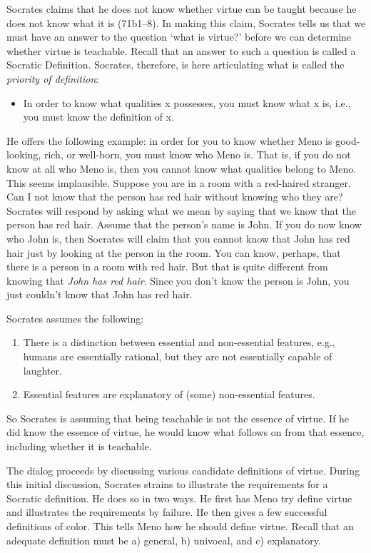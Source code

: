\documentclass[10 pt]{article}
\begin{document}
Socrates claims that he does not know whether virtue can be taught because he does not know what it is (71b1--8). In making this claim, Socrates tells us that we must have an answer to the question `what is virtue?' before we can determine whether virtue is teachable. Recall that an answer to such a question is called a Socratic Definition. Socrates, therefore, is here articulating what is called the \emph{priority of definition}:
\begin{itemize}
\item In order to know what qualities x possesses, you must know what x is, i.e., you must know the definition of x. 
\end{itemize}
He offers the following example: in order for you to know whether Meno is good-looking, rich, or well-born, you must know who Meno is. That is, if you do not know at all who Meno is, then you cannot know what qualities belong to Meno. This seems implausible. Suppose you are in a room with a red-haired stranger. Can I not know that the person has red hair without knowing who they are? Socrates will respond by asking what we mean by saying that we know that the person has red hair. Assume that the person's name is John. If you do now know who John is, then Socrates will claim that you cannot know that John has red hair just by looking at the person in the room. You can know, perhaps, that there is a person in a room with red hair. But that is quite different from knowing that \emph{John has red hair}. Since you don't know the person is John, you just couldn't know that John has red hair. 

Socrates assumes the following:
\begin{enumerate}
\item There is a distinction between essential and non-essential features, e.g., humans are essentially rational, but they are not essentially capable of laughter.
\item Essential features are explanatory of (some) non-essential features.
\end{enumerate}
So Socrates is assuming that being teachable is not the essence of virtue. If he did know the essence of virtue, he would know what follows on from that essence, including whether it is teachable. 

The dialog proceeds by discussing  various candidate definitions of virtue. During this initial discussion, Socrates strains to illustrate the requirements for a Socratic definition. He does so in two ways. He first has Meno try define virtue and illustrates the requirements by failure. He then gives a few successful definitions of color. This tells Meno how he should define virtue. Recall that an adequate definition must be a) general, b) univocal, and c) explanatory.  
\end{document}
